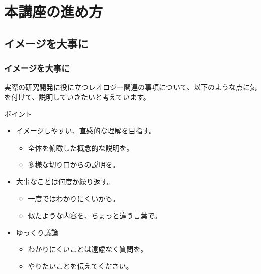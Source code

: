 \documentclass[12pt, dvipdfmx]{beamer}
\begin{document}
\section{本講座の進め方}
\subsection{イメージを大事に}
\begin{frame}
	\frametitle{イメージを大事に}
		実際の研究開発に役に立つレオロジー関連の事項について、以下のような点に気を付けて、説明していきたいと考えています。
		\begin{block}{ポイント}
			\begin{itemize}	
				\item イメージしやすい、直感的な理解を目指す。
					\begin{itemize}
						\item 全体を俯瞰した概念的な説明を。
						\item 多様な切り口からの説明を。
					\end{itemize}
				\item 大事なことは何度か繰り返す。
					\begin{itemize}
						\item 一度ではわかりにくいかも。
						\item 似たような内容を、ちょっと違う言葉で。
					\end{itemize}
				\item ゆっくり議論
					\begin{itemize}
						\item わかりにくいことは遠慮なく質問を。
						\item やりたいことを伝えてください。
					\end{itemize}
			\end{itemize}
		\end{block}
\end{frame}
\end{document}
